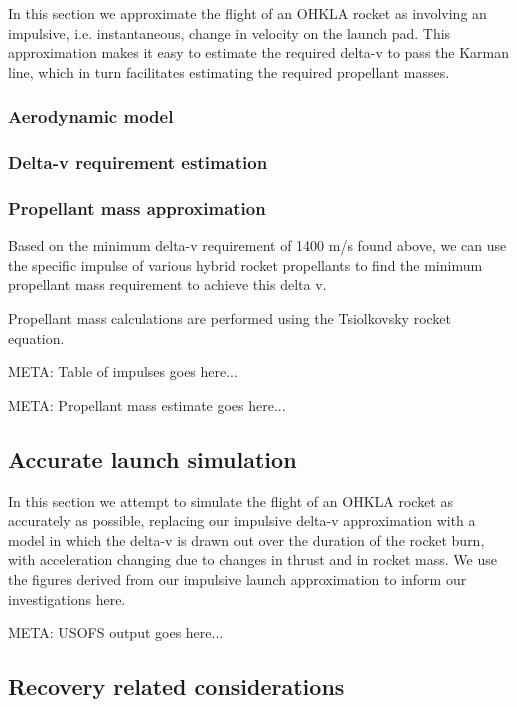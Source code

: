 \documentclass{report}
\begin{document}
In this section we approximate the flight of an OHKLA rocket as involving an impulsive, i.e. instantaneous, change in velocity on the launch pad.  This approximation makes it easy to estimate the required delta-v to pass the Karman line, which in turn facilitates estimating the required propellant masses.

\subsubsection{Aerodynamic model}

\subsubsection{Delta-v requirement estimation}

\subsubsection{Propellant mass approximation}

Based on the minimum delta-v requirement of 1400 m/s found above, we can use the specific impulse of various hybrid rocket propellants to find the minimum propellant mass requirement to achieve this delta v.

Propellant mass calculations are performed using the Tsiolkovsky rocket equation.

META: Table of impulses goes here...

META: Propellant mass estimate goes here...

\subsection{Accurate launch simulation}

In this section we attempt to simulate the flight of an OHKLA rocket as accurately as possible, replacing our impulsive delta-v approximation with a model in which the delta-v is drawn out over the duration of the rocket burn, with acceleration changing due to changes in thrust and in rocket mass.  We use the figures derived from our impulsive launch approximation to inform our investigations here.

META: USOFS output goes here...

\subsection{Recovery related considerations}
\end{document}
